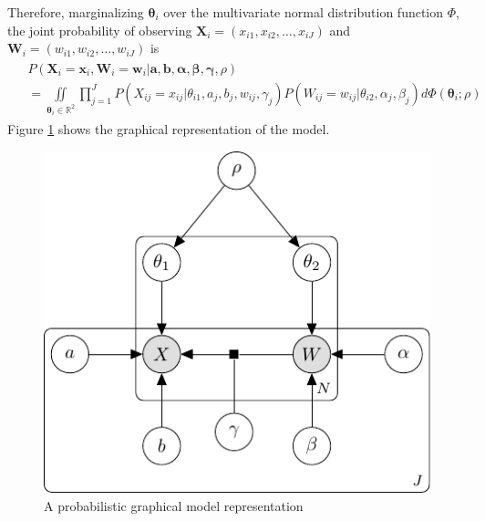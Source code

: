 \documentclass[11pt, letterpaper]{article}
\begin{document}
  Therefore, marginalizing $\bm{\theta}_i$ over the multivariate normal
  distribution function $\Phi$, the joint probability of observing $\bm{X}_i = 
  (x_{i1}, x_{i2}, \dots, x_{iJ})$ and $\bm{W}_i = (w_{i1}, w_{i2}, \dots, w_
  {iJ})$ is
  \begin{gather}
  \begin{aligned}
    &P(\bm{X}_i = \bm{x}_i, \bm{W}_i = \bm{w}_i | \bm{a}, \bm{b}, \bm{\alpha}, 
    \bm{\beta}, \bm{\gamma}, \rho)\\ &= \iint \limits_{\bm{\theta}_i \in 
    \mathbb{R}^2} \prod_{j = 1}^{J} P(X_{ij} = x_{ij} | \theta_{i1}, a_j, b_j, w_
    {ij}, \gamma_j)P(W_{ij} = w_{ij} | \theta_{i2}, \alpha_j, \beta_j) d\Phi
    (\bm{\theta}_i;\rho)
  \end{aligned}
  \end{gather}
  Figure \ref{fig:latent_variable_model} shows the graphical representation of
  the model.
  \begin{figure}
  \label{fig:latent_variable_model}
  \centering
    \includegraphics[scale = 1.0]{figure/joint_model_diagram.pdf}
    \caption{A probabilistic graphical model representation}
  \end{figure}
\end{document}
